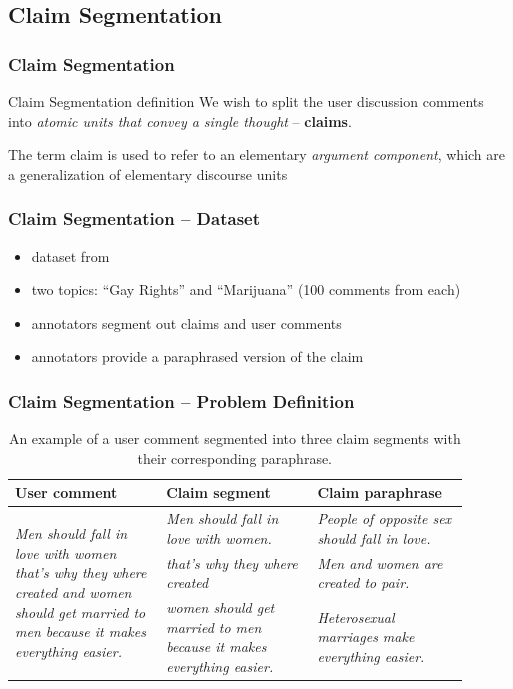 \documentclass{beamer}
\begin{document}
\subsection{Claim Segmentation}
\begin{frame}
\frametitle{Claim Segmentation}
\begin{block}{Claim Segmentation definition}
We wish to split the user discussion comments into \emph{atomic units
that convey a single thought} -- \textbf{claims}.

\end{block}

\vspace{0.5cm}
The term claim is used to refer to an elementary \emph{argument component}, 
which are a generalization of elementary discourse units
\cite{winter1982towards, givon1983topic, polanyi1996linguistic}
	
\end{frame}

\begin{frame}
	\frametitle{Claim Segmentation -- Dataset}

	\begin{itemize}
		\item dataset from \cite{hasan2014you}
		\item two topics: ``Gay Rights'' and ``Marijuana'' (100 comments from each)
		\item annotators segment out claims and user comments
		\item annotators provide a paraphrased version of the claim
	\end{itemize}

\end{frame}

\begin{frame}
\frametitle{Claim Segmentation -- Problem Definition}

\begin{table}[t]
\begin{center}
{\footnotesize
	\begin{tabular}{@{}p{0.3\linewidth} p{0.30\linewidth} p{0.30\linewidth} }
\toprule
\textbf{User comment} & \textbf{Claim segment} & \textbf{Claim paraphrase}   \\
\midrule
\multirow{3}{*}{\parbox{3cm}{
		\emph{Men should fall in love with women that's why they where
		created and women should get married to men because it makes
		everything easier. }
}}
&  
\emph{Men should fall in love with women.}
& \emph{People of opposite sex should fall in love.}
\\
\cmidrule{2-3}
& \emph{that's why they where created} & \emph{Men and women are created to pair.}
 \\
\cmidrule{2-3}
& \emph{women should get married to men because it makes everything easier.} & 
 \emph{Heterosexual marriages make everything easier.}
 \\
 \bottomrule
\end{tabular}}
\end{center}
\caption{An example of a user comment segmented into three claim segments with
	their corresponding paraphrase.}
\end{table}

\end{frame}
\end{document}
